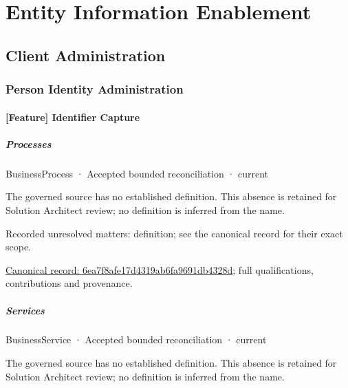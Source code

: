 \section{Entity Information Enablement}

\subsection{Client Administration}

\subsubsection{Person Identity Administration}

\paragraph{[Feature] Identifier Capture}

\subparagraph{Processes}



\label{element:6ea7f8afe17d4319ab6fa9691db4328d}
{\small BusinessProcess · Accepted bounded reconciliation · current}\par

The governed source has no established definition. This absence is retained for Solution Architect review; no definition is inferred from the name.


{\small Recorded unresolved matters: definition; see the canonical record for their exact scope.}\par
{\footnotesize \href{../../../../continuum/business/business-process/6ea7f8afe17d4319ab6fa9691db4328d.md}{Canonical record: 6ea7f8afe17d4319ab6fa9691db4328d}; full qualifications, contributions and provenance.}\par
\subparagraph{Services}



\label{element:063b7a6b4ad549428a7566a4ce2c5de5}
{\small BusinessService · Accepted bounded reconciliation · current}\par

The governed source has no established definition. This absence is retained for Solution Architect review; no definition is inferred from the name.


